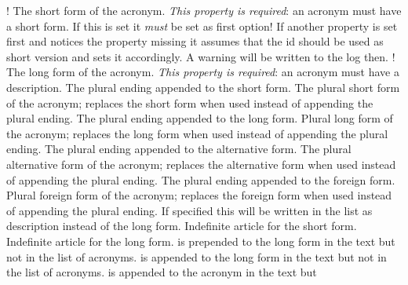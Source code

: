 \documentclass{acro-manual}
\begin{document}
\begin{properties}
  \Default!
    The short form of the acronym.  \emph{This property is required}: an
    acronym must have a short form.  If this is set it \emph{must} be set as
    first option! If another property is set first and notices the
     property missing it assumes that the \acs{id} should be
    used as short version and sets it accordingly.  A warning will be written
    to the log then.
  \Default!
    The long form of the acronym.  \emph{This property is required}: an
    acronym must have a description.
    The plural ending appended to the short form.
    The plural short form of the acronym; replaces the short
    form when used instead of appending the plural ending.
    The plural ending appended to the long form.
    Plural long form of the acronym; replaces the long form when used
    instead of appending the plural ending.
    The plural ending appended to the alternative form.
    The plural alternative form of the acronym; replaces the
    alternative form when used instead of appending the plural ending.
    The plural ending appended to the foreign form.
    Plural foreign form of the acronym; replaces the
    foreign form when used instead of appending the plural ending.
    If specified this will be written in the list as description instead of
    the long form.
    Indefinite article for the short form.
    Indefinite article for the long form.
     is prepended to the long form in the text but not in the list
    of acronyms.
     is appended to the long form in the text but not in the list
    of acronyms.
     is appended to the acronym in the text but

\end{properties}
\end{document}

